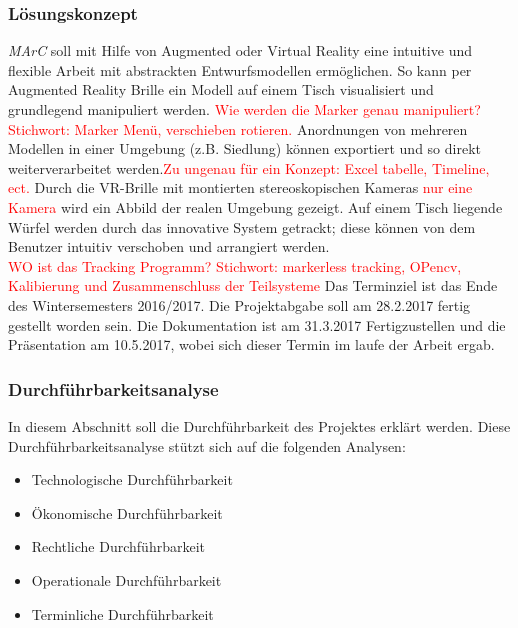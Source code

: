 \subsubsection{Lösungskonzept}
\textit{MArC} soll mit Hilfe von Augmented oder Virtual Reality eine intuitive und flexible Arbeit mit abstrackten Entwurfsmodellen ermöglichen. So kann per Augmented Reality Brille ein Modell auf einem Tisch visualisiert und grundlegend manipuliert werden. \textcolor{red}{Wie werden die Marker genau manipuliert? Stichwort: Marker Menü, verschieben rotieren.}
Anordnungen von mehreren Modellen in einer Umgebung (z.B. Siedlung) können exportiert und so direkt weiterverarbeitet werden.\textcolor{red}{Zu ungenau für ein Konzept: Excel tabelle, Timeline, ect.}
Durch die VR-Brille mit montierten stereoskopischen Kameras \textcolor{red}{nur eine Kamera} wird ein Abbild der realen Umgebung gezeigt. Auf einem Tisch liegende Würfel werden durch das innovative System getrackt; diese können von dem Benutzer intuitiv verschoben und arrangiert werden. \\
\textcolor{red}{WO ist das Tracking Programm? Stichwort: markerless tracking, OPencv, Kalibierung und Zusammenschluss der Teilsysteme}
Das Terminziel ist das Ende des Wintersemesters 2016/2017. Die Projektabgabe soll am 28.2.2017 fertig gestellt worden sein. Die Dokumentation ist am 31.3.2017 Fertigzustellen und die Präsentation am 10.5.2017, wobei sich dieser Termin im laufe der Arbeit ergab.

 
\subsubsection{Durchführbarkeitsanalyse}
In diesem Abschnitt soll die Durchführbarkeit des Projektes erklärt werden. Diese Durchführbarkeitsanalyse stützt sich auf die folgenden Analysen:
\begin{itemize}
	\item Technologische Durchführbarkeit
	\item  Ökonomische Durchführbarkeit
	\item Rechtliche Durchführbarkeit
	\item  Operationale Durchführbarkeit
	\item  Terminliche Durchführbarkeit
\end{itemize}

